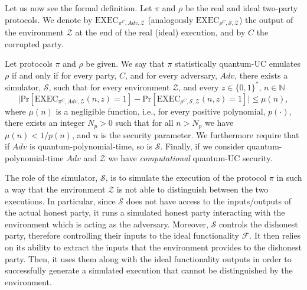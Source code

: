 Let us now see the formal definition. Let $\mathcal{\pi}$ and $\rho$ be the real and ideal two-party protocols. We denote by $\text{EXEC}_{\mathcal{\pi}^C, Adv, \mathcal{Z}}$ (analogously $\text{EXEC}_{\rho^C, \mathcal{S}, \mathcal{Z}}$) the output of the environment $\mathcal{Z}$ at the end of the real (ideal) execution, and by $C$ the corrupted party. 

\begin{definition}

Let protocols $\pi$ and $\rho$ be given. We say that $\pi$ statistically quantum-UC emulates $\rho$ if and only if for every party, $C$, and for every adversary, $Adv$, there exists a simulator, $\mathcal{S}$, such that for every environment $\mathcal{Z}$, and every $z\in\{0,1\}^*$, $n\in\mathbb{N}$
\begin{equation*}
    \big|\text{Pr}[\text{EXEC}_{\mathcal{\pi}^C, Adv, \mathcal{Z}} (n, z) = 1] - \text{Pr}[\text{EXEC}_{\rho^C, \mathcal{S}, \mathcal{Z}}(n, z) = 1]\big| \leq \mu(n),
\end{equation*}
 where $\mu(n)$ is a negligible function, i.e., for every positive polynomial, $p(\cdot)$, there exists an integer $N_p>0$ such that for all $n> N_p$ we have $\mu(n)<1/p(n)$, and $n$ is the security parameter. We furthermore require that if $Adv$ is quantum-polynomial-time, so is $\mathcal{S}$. Finally, if we consider quantum-polynomial-time $Adv$ and $\mathcal{Z}$ we have \textit{computational} quantum-UC security.
\label{def:statisticalquc}
\end{definition}



 The role of the simulator, $\mathcal{S}$, is to  simulate the execution of the protocol $\mathcal{\pi}$ in such a way that the environment $\mathcal{Z}$ is not able to distinguish between the two executions. 
In particular, since $\mathcal{S}$ does not have access to the inputs/outputs of the actual honest party, it runs a simulated honest party interacting with the environment which is acting as the adversary. Moreover, $\mathcal{S}$ controls the  dishonest party, therefore controlling their inputs to the ideal functionality $\mathcal{F}$. 
It then relies on its ability to extract the inputs  that the environment provides to the dishonest party. Then, it uses them along with the ideal functionality outputs in order to successfully generate a simulated execution that cannot be distinguished by the environment.

